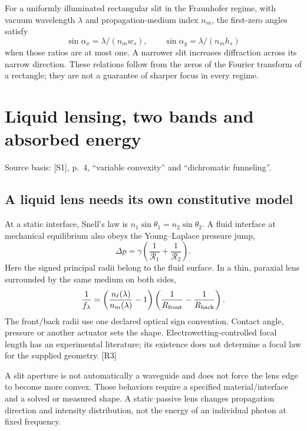 \documentclass[10pt,a4paper]{article}
\numberwithin{equation}{section}
\newcommand{\src}[1]{\textcolor{muted}{\footnotesize Source basis: #1.}}
\newcommand{\newpart}{\clearpage}
\begin{document}
For a uniformly illuminated rectangular slit in the Fraunhofer regime, with vacuum wavelength $\lambda$ and propagation-medium index $n_m$, the first-zero angles satisfy
\begin{equation}
\sin\alpha_x=\lambda/(n_mw_s),\qquad \sin\alpha_y=\lambda/(n_mh_s)
\end{equation}
when those ratios are at most one. A narrower slit increases diffraction across its narrow direction. These relations follow from the zeros of the Fourier transform of a rectangle; they are not a guarantee of sharper focus in every regime.

\newpart
\section{Liquid lensing, two bands and absorbed energy}
\label{sec:optics}
\src{[S1], p.~4, ``variable convexity'' and ``dichromatic funneling''}

\subsection*{A liquid lens needs its own constitutive model}
At a static interface, Snell's law is $n_1\sin\theta_1=n_2\sin\theta_2$. A fluid interface at mechanical equilibrium also obeys the Young--Laplace pressure jump,
\begin{equation}
\Delta p=\gamma\left(\frac1{\mathcal R_1}+\frac1{\mathcal R_2}\right).
\end{equation}
Here the signed principal radii belong to the fluid surface. In a thin, paraxial lens surrounded by the same medium on both sides,
\begin{equation}
\frac1{f_\lambda}=\left(\frac{n_\ell(\lambda)}{n_m(\lambda)}-1\right)
\left(\frac1{R_{\rm front}}-\frac1{R_{\rm back}}\right).
\end{equation}
The front/back radii use one declared optical sign convention. Contact angle, pressure or another actuator sets the shape. Electrowetting-controlled focal length has an experimental literature; its existence does not determine a focal law for the supplied geometry. [R3]

A slit aperture is not automatically a waveguide and does not force the lens edge to become more convex. Those behaviors require a specified material/interface and a solved or measured shape. A static passive lens changes propagation direction and intensity distribution, not the energy of an individual photon at fixed frequency.
\end{document}
